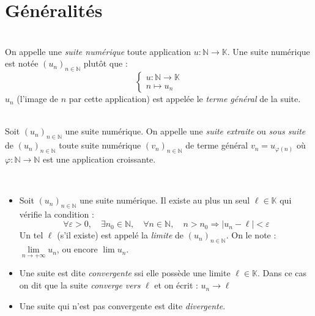 \section{Généralités}
    \begin{definition}
        \ \\
        On appelle une \emph{suite numérique} toute application \(u:\mathbb{N} \rightarrow \mathbb{K}\).
        Une suite numérique est notée \((u_n)_{n \in \mathbb{N}}\) plutôt que :
        \[
            \left\{
                \begin{array}{l}
                    u: \mathbb{N} \rightarrow \mathbb{K}\\
                    n \mapsto u_n
                \end{array}
            \right.    
        \]
        \(u_n\) (l'image de \(n\) par cette application) est appelée le \emph{terme général} de la suite.
    \end{definition}

    \begin{definition}
        \ \\
        Soit \((u_n)_{n\in\mathbb{N}}\) une suite numérique. On appelle une \emph{suite extraite} ou \emph{sous suite} de \((u_n)_{n\in\mathbb{N}}\) toute suite numérique \((v_n)_{n\in\mathbb{N}}\) de terme général \(v_n = u_{\varphi(n)}\) où \(\varphi: \mathbb{N} \rightarrow \mathbb{N}\) est une application croissante.
    \end{definition}
    
    \begin{thedef}
        \ \\
        \label{definition:limite_suite}
        \begin{itemize}
            \item Soit \((u_n)_{n\in\mathbb{N}}\) une suite numérique. Il existe au plus un seul \(\ell\in\mathbb{K}\) qui vérifie la condition :
            \[
                \forall \varepsilon > 0, \quad \exists n_0 \in \mathbb{N}, \quad \forall n \in \mathbb{N}, \quad n > n_0 \Rightarrow |u_n - \ell| < \varepsilon    
            \]
            Un tel \(\ell\) (s'il existe) est appelé la \emph{limite} de \((u_n)_{n\in\mathbb{N}}\). On le note :  \(\lim\limits_{n\to+\infty}u_n\), ou encore \(\lim u_n\).
            \item Une suite est dite \emph{convergente} ssi elle possède une limite \(\ell \in \mathbb{K}\). Dans ce cas on dit que la suite \emph{converge vers} \(\ell\) et on écrit : \(u_n \to\ell \)
            \item Une suite qui n'est pas convergente est dite \emph{divergente}.
        \end{itemize}
    \end{thedef}


